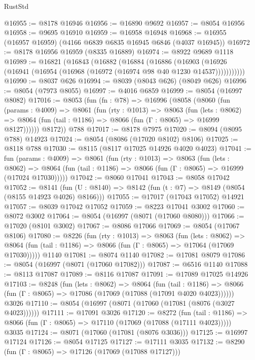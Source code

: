 \begin{lexlean}{RustStd}
\begin{coremodule}
@16955 := @8178 @16946
@16956 := @16890 @9692
@16957 := @8054 @16956
@16958 := @9695 @16910
@16959 := @16958 @16948
@16968 := @16955 (@16957 @16959) (@4166 @6839 @6835 @16945 @6846 (@4037 @16945))
@16972 := @8178 @16956 @16959 (@8335 @16889)
@16974 := @8922 @9689 @1118
@16989 := @16821
    (@16843
      (@16882
        (@16884
          (@16886
            (@16903 (@16926 (@16941 (@16954 (@16968 (@16972 (@16974 @98 @40 @1230 @14537)))))))))))
@16990 := @8037 @626
@16994 := @8039 (@8043 @626) (@8049 @626)
@16996 := @8054 (@7973 @8055)
@16997 := @4016 @6859
@16999 := @8054 (@16997 @8082)
@17016 := @8053
    (fun (fn : @78) =>
    @16996
      (@8058
        (@8060
          (fun (params : @4009) =>
          @8061
            (fun (rty : @1013) =>
            @8063
              (fun (lets : @8062) =>
              @8064 (fun (tail : @1186) => @8066 (fun (Γ : @8065) => @16999 @8127))))))
        @8172))
    @788
@17017 := @8178 @7975
@17020 := @8094 (@8095 @788) @14923
@17024 := @8054 (@8086 (@17020 @8102) @8106)
@17025 := @8118 @788
@17030 := @8115 (@8117 @17025 @14926 @4020 @4023)
@17041 := fun (params : @4009) =>
  @8061
    (fun (rty : @1013) =>
    @8063
      (fun (lets : @8062) =>
      @8064 (fun (tail : @1186) => @8066 (fun (Γ : @8065) => @16999 (@17024 @17030)))))
@17042 := @8060 @17041
@17043 := @8058 @17042
@17052 := @8141
    (fun (U : @8140) => @8142 (fun (t : @7) => @8149 (@8054 (@8155 @14923 @4026) @8166)))
@17055 := @17017 (@17043 @17052) @14921
@17057 := @8039 @17042 @17052
@17059 := @8223 @17041 @3002
@17060 := @8072 @3002
@17064 := @8054 (@16997 (@8071 (@17060 @8080)))
@17066 := @17020 (@8101 @3002)
@17067 := @8086 @17066
@17069 := @8054 (@17067 @8106)
@17080 := @8226
    (fun (rty : @1013) =>
    @8063
      (fun (lets : @8062) =>
      @8064 (fun (tail : @1186) => @8066 (fun (Γ : @8065) => @17064 (@17069 @17030)))))
    @1140
@17081 := @8074 @1140
@17082 := @17081 @8079
@17086 := @8054 (@16997 (@8071 (@17060 @17082)))
@17087 := @6516 @1140
@17088 := @8113 @17087
@17089 := @8116 @17087
@17091 := @17089 @17025 @14926
@17103 := @8248
    (fun (lets : @8062) =>
    @8064
      (fun (tail : @1186) =>
      @8066 (fun (Γ : @8065) => @17086 (@17069 (@17088 (@17091 @4020 @4023))))))
    @3026
@17110 := @8054 (@16997 (@8071 (@17060 (@17081 (@8076 (@3027 @4023))))))
@17111 := @17091 @3026
@17120 := @8272
    (fun (tail : @1186) => @8066 (fun (Γ : @8065) => @17110 (@17069 (@17088 (@17111 @4023)))))
    @3035
@17124 := @8071 (@17060 (@17081 (@8076 @3036)))
@17125 := @16997 @17124
@17126 := @8054 @17125
@17127 := @17111 @3035
@17132 := @8290 (fun (Γ : @8065) => @17126 (@17069 (@17088 @17127)))

\end{coremodule}
\end{lexlean}
